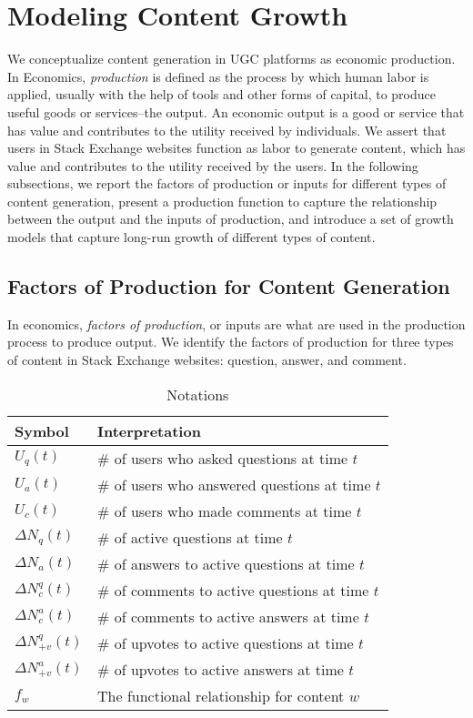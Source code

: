 \section{Modeling Content Growth}
We conceptualize content generation in UGC platforms as economic production. In Economics, \emph{production} is defined as the process by which human labor is applied, usually with the help of tools and other forms of capital, to produce useful goods or services--the output. An economic output is a good or service that has value and contributes to the utility received by individuals. We assert that users in Stack Exchange websites function as labor to generate content, which has value and contributes to the utility received by the users. In the following subsections, we report the factors of production or inputs for different types of content generation, present a production function to capture the relationship between the output and the inputs of production, and introduce a set of growth models that capture long-run growth of different types of content.

%

\subsection{Factors of Production for Content Generation}
In economics, \emph{factors of production}, or inputs are what are used in the production process to produce output. We identify the factors of production for three types of content in Stack Exchange websites: question, answer, and comment. %
\begin{table}[hbt]
	\centering
	\begin{tabular}{|l|l|}
	\hline
	\textbf{Symbol} & \textbf{Interpretation}\\ \hline
	$U_q(t)$ & \# of users who asked questions at time $t$\\ \hline
	$U_a(t)$ & \# of users who answered questions at time $t$\\ \hline
	$U_c(t)$ & \# of users who made comments at time $t$\\ \hline
	$\Delta N_q(t)$ & \# of active questions at time $t$\\ \hline
	$\Delta N_a(t)$ & \# of answers to active questions at time $t$\\ \hline
	$\Delta N_c^q(t)$ & \# of comments to active questions at time $t$\\ \hline
	$\Delta N_c^a(t)$ & \# of comments to active answers at time $t$\\ \hline
	$\Delta N_{+v}^q(t)$ & \# of upvotes to active questions at time $t$\\ \hline
	$\Delta N_{+v}^a(t)$ & \# of upvotes to active answers at time $t$\\ \hline
	$f_w$ & The functional relationship for content $w$\\ \hline
	 \end{tabular}
    \caption{Notations}
\end{table}

